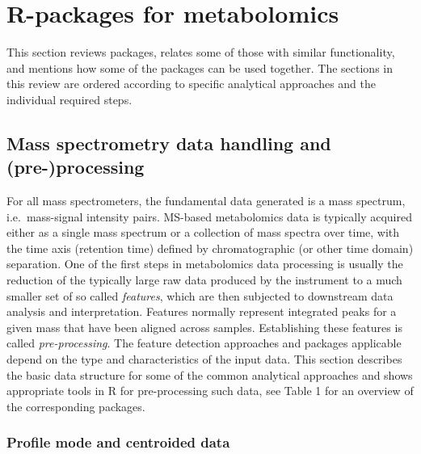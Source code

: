 \documentclass[]{article}
\begin{document}
\newpage

\hypertarget{r-packages-for-metabolomics}{%
\section{R-packages for metabolomics}\label{r-packages-for-metabolomics}}

This section reviews packages, relates some of those with similar functionality, and mentions how some of the packages can be used together. The sections in this review are ordered according to specific analytical approaches and the individual required steps.

\newpage

\hypertarget{mass-spectrometry-data-handling-and-pre-processing}{%
\subsection{Mass spectrometry data handling and (pre-)processing}\label{mass-spectrometry-data-handling-and-pre-processing}}

For all mass spectrometers, the fundamental data generated is a mass spectrum, i.e.~mass-signal intensity pairs. MS-based metabolomics data is typically acquired either as a single mass spectrum or a collection of mass spectra over time, with the time axis (retention time) defined by chromatographic (or other time domain) separation. One of the first steps in metabolomics data processing is usually the reduction of the typically large raw data produced by the instrument to a much smaller set of so called \emph{features}, which are then subjected to downstream data analysis and interpretation. Features normally represent integrated peaks for a given mass that have been aligned across samples. Establishing these features is called \emph{pre-processing}. The feature detection approaches and packages applicable depend on the type and characteristics of the input data. This section describes the basic data structure for some of the common analytical approaches and shows appropriate tools in R for pre-processing such data, see Table 1 for an overview of the corresponding packages.

\hypertarget{profile-mode-and-centroided-data}{%
\subsubsection{Profile mode and centroided data}\label{profile-mode-and-centroided-data}}
\end{document}
